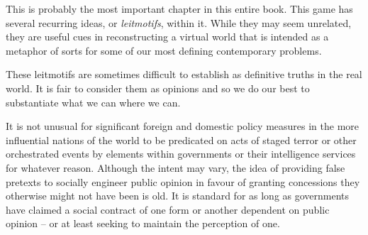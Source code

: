 

This is probably the most important chapter in this entire book. This game has several recurring ideas, or {\it leitmotifs}, within it. While they may seem unrelated, they are useful cues in reconstructing a virtual world that is intended as a metaphor of sorts for some of our most defining contemporary problems. 

These leitmotifs are sometimes difficult to establish as definitive truths in the real world. It is fair to consider them as opinions and so we do our best to substantiate what we can where we can. 

\startitemize[4]

It is not unusual for significant foreign and domestic policy measures in the more influential nations of the world to be predicated on acts of staged terror or other orchestrated events by elements within governments or their intelligence services for whatever reason. Although the intent may vary, the idea of providing false pretexts to socially engineer public opinion in favour of granting concessions they otherwise might not have been is old. It is standard for as long as governments have claimed a social contract of one form or another dependent on public opinion -- or at least seeking to maintain the perception of one.

